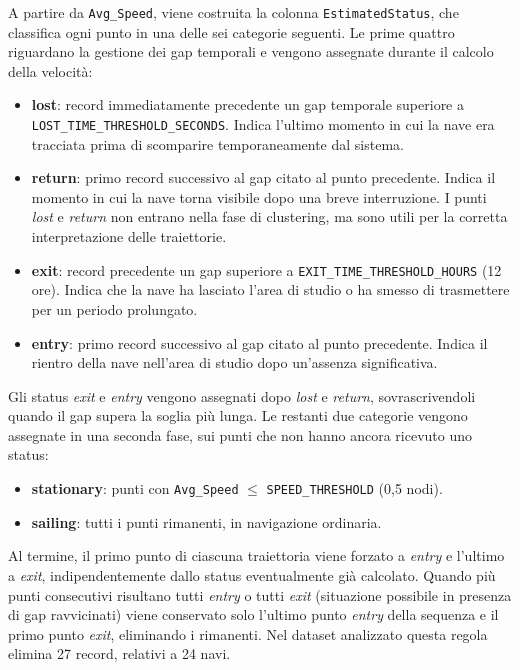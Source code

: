 A partire da \texttt{Avg\_Speed}, viene costruita la colonna \texttt{EstimatedStatus}, che classifica ogni punto
in una delle sei categorie seguenti. Le prime quattro riguardano la gestione dei gap temporali e vengono
assegnate durante il calcolo della velocità:
 
\begin{itemize}
    \item \textbf{lost}: record immediatamente precedente un gap temporale superiore a \texttt{LOST\_\allowbreak{}TIME\_\allowbreak{}THRESHOLD\_\allowbreak{}SECONDS}.
          Indica l'ultimo momento in cui la nave era tracciata prima di scomparire temporaneamente dal sistema.
    \item \textbf{return}: primo record successivo al gap citato al punto precedente. Indica il momento in cui la nave torna visibile
          dopo una breve interruzione. I punti \emph{lost} e \emph{return} non entrano nella fase di clustering,
          ma sono utili per la corretta interpretazione delle traiettorie.
    \item \textbf{exit}: record precedente un gap superiore a \texttt{EXIT\_\allowbreak{}TIME\_\allowbreak{}THRESHOLD\_\allowbreak{}HOURS}
          (12 ore). Indica che la nave ha lasciato l'area di studio o ha smesso di trasmettere per un periodo
          prolungato.
    \item \textbf{entry}: primo record successivo al gap citato al punto precedente. Indica il rientro della nave 
          nell'area di studio dopo un'assenza significativa.
\end{itemize}
 
Gli status \emph{exit} e \emph{entry} vengono assegnati dopo \emph{lost} e \emph{return}, sovrascrivendoli quando
il gap supera la soglia più lunga.
Le restanti due categorie vengono assegnate in una seconda fase, sui punti che non hanno ancora ricevuto uno status:
 
\begin{itemize}
    \item \textbf{stationary}: punti con \texttt{Avg\_Speed} $\leq$ \texttt{SPEED\_THRESHOLD} (0,5 nodi).
    \item \textbf{sailing}: tutti i punti rimanenti, in navigazione ordinaria.
\end{itemize}
 
Al termine, il primo punto di ciascuna traiettoria viene forzato a \emph{entry} e l'ultimo a \emph{exit},
indipendentemente dallo status eventualmente già calcolato. Quando più punti consecutivi risultano tutti \emph{entry} o tutti
\emph{exit} (situazione possibile in presenza di gap ravvicinati) viene conservato solo l'ultimo punto
\emph{entry} della sequenza e il primo punto \emph{exit}, eliminando i rimanenti. Nel dataset
analizzato questa regola elimina 27 record, relativi a 24 navi.


